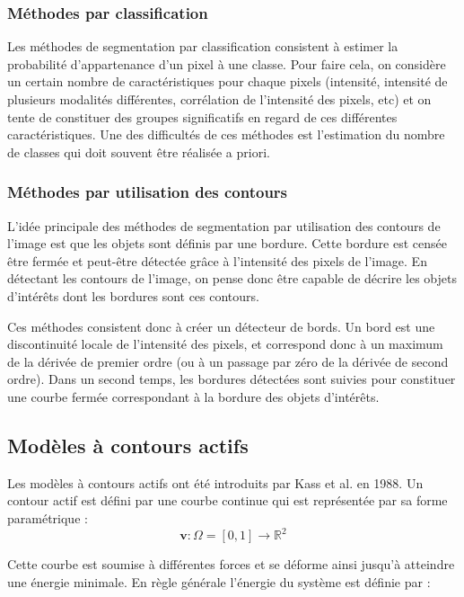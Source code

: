 \subsubsection*{Méthodes par classification}
Les méthodes de segmentation par classification consistent à estimer la probabilité d'appartenance d'un pixel à une classe. Pour faire cela, on considère un certain nombre de caractéristiques pour chaque pixels (intensité, intensité de plusieurs modalités différentes, corrélation de l'intensité des pixels, etc) et on tente de constituer des groupes significatifs en regard de ces différentes caractéristiques. Une des difficultés de ces méthodes est l'estimation du nombre de classes qui doit souvent être réalisée a priori.


\subsubsection*{Méthodes par utilisation des contours}

L'idée principale des méthodes de segmentation par utilisation des contours de l'image est que les objets sont définis par une bordure. Cette bordure est censée être fermée et peut-être détectée grâce à l'intensité des pixels de l'image. En détectant les contours de l'image, on pense donc être capable de décrire les objets d'intérêts dont les bordures sont ces contours.

Ces méthodes consistent donc à créer un détecteur de bords. Un bord est une discontinuité locale de l'intensité des pixels, et correspond donc à un maximum de la dérivée de premier ordre (ou à un passage par zéro de la dérivée de second ordre). Dans un second temps, les bordures détectées sont suivies pour constituer une courbe fermée correspondant à la bordure des objets d'intérêts.




\subsection{Modèles à contours actifs}

Les modèles à contours actifs ont été introduits par Kass et al. en 1988. Un contour actif est défini par une courbe continue qui est représentée par sa forme paramétrique :
\begin{equation*}
\mathbf{v} : \Omega =[0,1] \rightarrow \mathbb{R}^2
\end{equation*}

Cette courbe est soumise à différentes forces et se déforme ainsi jusqu'à atteindre une énergie minimale. En règle générale l'énergie du système est définie par : 


